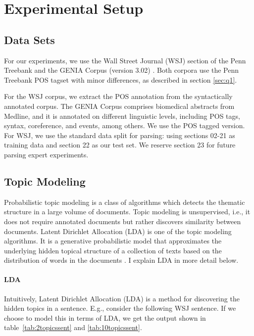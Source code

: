 \section{Experimental Setup}\label{sec:setup}


\subsection{Data Sets}


For our experiments, we use the Wall Street Journal (WSJ) section of
the Penn Treebank \cite{marcus:kim:ea:94} and the GENIA Corpus
(version 3.02) \cite{tateisi:tsujii:04}. Both corpora use the Penn
Treebank POS tagset \cite{santorini:90} with minor differences, as
described in section \ref{sec:q1}.

For the WSJ corpus, we extract the POS annotation from the
syntactically annotated corpus. The GENIA Corpus comprises biomedical
abstracts from Medline, and it is annotated on different
linguistic levels, including POS tags, syntax, coreference, and
events, among others. We use the POS tagged version. For WSJ, we use
the standard data split for parsing:  using sections 02-21 as training data and
section 22 as our test set. We reserve section 23 for future 
parsing expert experiments.



\subsection{Topic Modeling}\label{sec:tm}

Probabilistic topic modeling is a class of algorithms which detects
the thematic structure in a large volume of documents. Topic modeling
is unsupervised, i.e., it does not require annotated
documents \cite{Blei:2012:PTM:2133806.2133826} but rather discovers similarity between documents. Latent Dirichlet
Allocation (LDA) is one of the topic modeling algorithms. It is a
generative probabilistic model that approximates the underlying hidden topical structure of a collection of texts based on the distribution of words in the documents \cite{Blei:2003:LDA:944919.944937}. I explain LDA in more detail below.

\paragraph*{LDA} 

Intuitively, Latent Dirichlet Allocation (LDA) is a method for discovering the hidden topics in a sentence. E.g., consider the following WSJ sentence. If we choose to model this in terms of LDA, we get the output shown in table~\ref{tab:2topicssent} and \ref{tab:10topicssent}.


